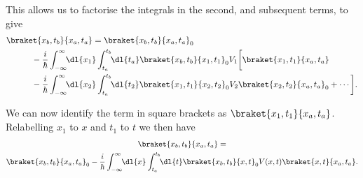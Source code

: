 \documentclass[fleqn]{NotesClass}
\begin{document}
    This allows us to factorise the integrals in the second, and subsequent terms, to give
    \begin{align}
        &\braket{x_b, t_b}{x_a, t_a} = \braket{x_b, t_b}{x_a, t_a}_0\notag\\
        &\qquad\quad{} - \frac{i}{\hbar} \int_{-\infty}^{\infty} \!\! \dl{x_1} \int_{t_a}^{t_b} \!\! \dl{t_a} \braket{x_b, t_b}{x_1, t_1}_0 V_1 \bigg[\braket{x_1, t_1}{x_a, t_a}\notag\\
        &\qquad\quad {} - \frac{i}{\hbar} \int_{-\infty}^{\infty} \!\! \dl{x_2} \int_{t_a}^{t_b} \!\! \dl{t_2} \braket{x_1, t_1}{x_2, t_2}_0 V_2 \braket{x_2, t_2}{x_a, t_a}_0 + \dotsb \bigg].\label{eqn:transition amplitude 2}
    \end{align}
    
    We can now identify the term in square brackets as \(\braket{x_1, t_1}{x_a, t_a}\).
    Relabelling \(x_1\) to \(x\) and \(t_1\) to \(t\) we then have
    \begin{multline}\label{eqn:transition amplitude}
        \braket{x_b, t_b}{x_a, t_a} =\\
        \braket{x_b, t_b}{x_a, t_a}_0 - \frac{i}{\hbar} \int_{-\infty}^{\infty} \!\! \dl{x} \int_{t_a}^{t_b} \!\! \dl{t} \braket{x_b, t_b}{x, t}_0 V(x, t) \braket{x, t}{x_a, t_a}.
    \end{multline}
    
\end{document}
